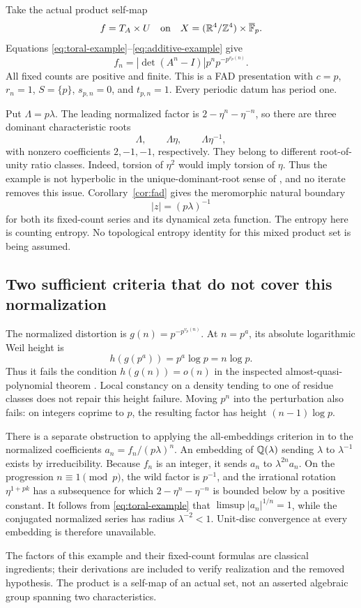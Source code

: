 Take the actual product self-map
\[
f=T_A\times U
\quad\text{on}\quad
X=(\mathbb R^4/\mathbb Z^4)\times\overline{\mathbb F}_p.
\]
Equations \eqref{eq:toral-example}--\eqref{eq:additive-example} give
\begin{equation}\label{eq:product-example}
f_n=|\det(A^n-I)|p^n p^{-p^{v_p(n)}}.
\end{equation}
All fixed counts are positive and finite. This is a FAD presentation
with \(c=p\), \(r_n=1\), \(S=\{p\}\), \(s_{p,n}=0\), and \(t_{p,n}=1\).
Every periodic datum has period one.

Put \(\Lambda=p\lambda\). The leading normalized factor is
\(2-\eta^n-\eta^{-n}\), so there are three dominant characteristic
roots
\[
\Lambda,\qquad \Lambda\eta,\qquad \Lambda\eta^{-1},
\]
with nonzero coefficients \(2,-1,-1\), respectively. They belong to
different root-of-unity ratio classes. Indeed, torsion of \(\eta^2\)
would imply torsion of \(\eta\). Thus the example is not hyperbolic in
the unique-dominant-root sense of
\citep[Definition 10.3.9]{bch2024}, and no iterate removes this issue.
Corollary~\ref{cor:fad} gives the meromorphic natural boundary
\begin{equation}\label{eq:example-radius}
|z|=(p\lambda)^{-1}
\end{equation}
for both its fixed-count series and its dynamical zeta function.
The entropy here is counting entropy. No topological entropy identity
for this mixed product set is being assumed.

\subsection{Two sufficient criteria that do not cover this normalization}

The normalized distortion is \(g(n)=p^{-p^{v_p(n)}}\). At \(n=p^a\),
its absolute logarithmic Weil height is
\[
h(g(p^a))=p^a\log p=n\log p.
\]
Thus it fails the condition \(h(g(n))=o(n)\) in the inspected
almost-quasi-polynomial theorem \citep[Definition 2.11]{bhn2025}.
Local constancy on a density tending to one of residue classes does
not repair this height failure. Moving \(p^n\) into the perturbation
also fails: on integers coprime to \(p\), the resulting factor has
height \((n-1)\log p\).

There is a separate obstruction to applying the all-embeddings
criterion in \citep[Theorems 1.2 and 1.6]{bgns2023} to the normalized
coefficients \(a_n=f_n/(p\lambda)^n\). An embedding of \(\mathbb Q(\lambda)\)
sending \(\lambda\) to \(\lambda^{-1}\) exists by irreducibility.
Because \(f_n\) is an integer, it sends \(a_n\) to
\(\lambda^{2n}a_n\). On the progression \(n\equiv1\pmod p\), the wild
factor is \(p^{-1}\), and the irrational rotation
\(\eta^{1+pk}\) has a subsequence for which
\(2-\eta^n-\eta^{-n}\) is bounded below by a positive constant.
It follows from \eqref{eq:toral-example} that
\(\limsup |a_n|^{1/n}=1\), while the conjugated normalized series has
radius \(\lambda^{-2}<1\). Unit-disc convergence at every embedding
is therefore unavailable.

The factors of this example and their fixed-count formulas are
classical ingredients; their derivations are included to verify
realization and the removed hypothesis. The product is a self-map
of an actual set, not an asserted algebraic group spanning two
characteristics.
